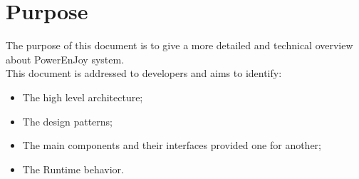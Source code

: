 \section{Purpose}
The purpose of this document is to give a more detailed and technical overview about PowerEnJoy system. \\
This document is addressed to developers and aims to identify:
\begin{itemize}
\item The high level architecture;
\item The design patterns;
\item The main components and their interfaces provided one for another;
\item The Runtime behavior.
\end{itemize}
